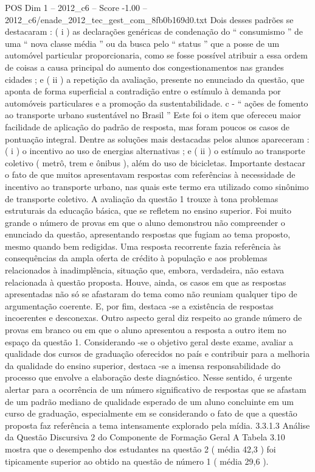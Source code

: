 \begin{textsample}{POS Dim 1 – 2012\_c6 – Score -1.00 – 2012\_c6/enade\_2012\_tec\_gest\_com\_8fb0b169d0.txt}
Dois desses padrões se destacaram : ( i ) as declarações genéricas de condenação do “ consumismo ” de uma “ nova classe média ” ou da busca pelo “ status ” que a posse de um automóvel particular proporcionaria, como se fosse possível atribuir a essa ordem de coisas a causa principal do aumento dos congestionamentos nas grandes cidades ; e ( ii ) a repetição da avaliação, presente no enunciado da questão, que aponta de forma superficial a contradição entre o estímulo à demanda por automóveis particulares e a promoção da sustentabilidade. c - “ ações de fomento ao transporte urbano sustentável no Brasil ” Este foi o item que ofereceu maior facilidade de aplicação do padrão de resposta, mas foram poucos os casos de pontuação integral.
Dentre as soluções mais destacadas pelos alunos apareceram : ( i ) o incentivo ao uso de energias alternativas ; e ( ii ) o estímulo ao transporte coletivo ( metrô, trem e ônibus ), além do uso de bicicletas.
Importante destacar o fato de que muitos apresentavam respostas com referências à necessidade de incentivo ao transporte urbano, nas quais este termo era utilizado como sinônimo de transporte coletivo.
A avaliação da questão 1 trouxe à tona problemas estruturais da educação básica, que se refletem no ensino superior.
Foi muito grande o número de provas em que o aluno demonstrou não compreender o enunciado da questão, apresentando respostas que fugiam ao tema proposto, mesmo quando bem redigidas.
Uma resposta recorrente fazia referência às consequências da ampla oferta de crédito à população e aos problemas relacionados à inadimplência, situação que, embora, verdadeira, não estava relacionada à questão proposta.
Houve, ainda, os casos em que as respostas apresentadas não só se afastaram do tema como não reuniam qualquer tipo de argumentação coerente.
E, por fim, destaca -se a existência de respostas incoerentes e desconexas.
Outro aspecto geral diz respeito ao grande número de provas em branco ou em que o aluno apresentou a resposta a outro item no espaço da questão 1.
Considerando -se o objetivo geral deste exame, avaliar a qualidade dos cursos de graduação oferecidos no país e contribuir para a melhoria da qualidade do ensino superior, destaca -se a imensa responsabilidade do processo que envolve a elaboração deste diagnóstico.
Nesse sentido, é urgente alertar para a ocorrência de um número significativo de respostas que se afastam de um padrão mediano de qualidade esperado de um aluno concluinte em um curso de graduação, especialmente em se considerando o fato de que a questão proposta faz referência a tema intensamente explorado pela mídia. 3.3.1.3 Análise da Questão Discursiva 2 do Componente de Formação Geral A Tabela 3.10 mostra que o desempenho dos estudantes na questão 2 ( média 42,3 ) foi tipicamente superior ao obtido na questão de número 1 ( média 29,6 ).

\end{textsample}
